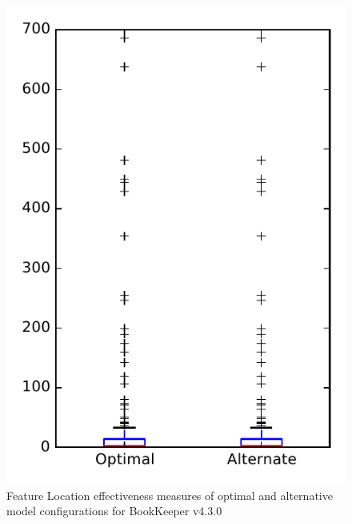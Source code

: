 
\begin{figure}
\centering
\includegraphics[height=0.4\textheight]{figures/combo/flt_rq1_bookkeeper}
\caption{Feature Location effectiveness measures of optimal and alternative model configurations for BookKeeper v4.3.0}
\label{fig:combo:flt:rq1:bookkeeper}
\end{figure}
